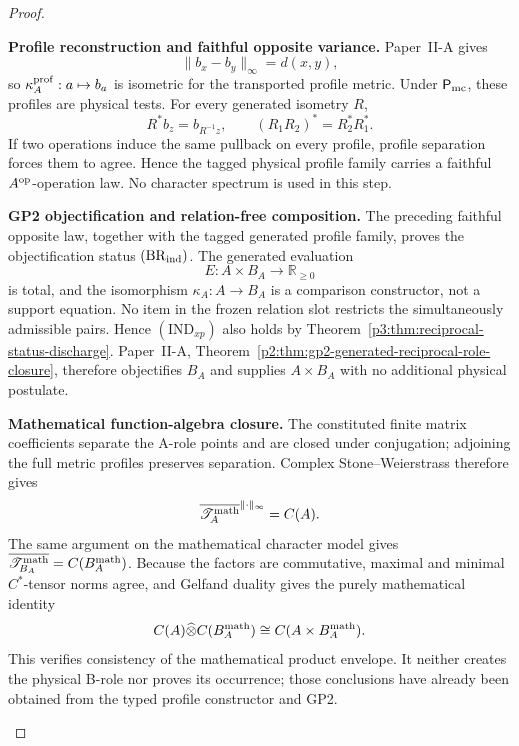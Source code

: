 \documentclass[11pt,a4paper]{article}
\begin{document}
\begin{proof}
\begin{proofsteps}
\item \textbf{Profile reconstruction and faithful opposite variance.}
Paper~II-A gives
\[
 \|b_x-b_y\|_\infty=d(x,y),
\]
so \(\kappa_A^{\rm prof}:a\mapsto b_a\) is isometric for the transported
profile metric.  Under \(\mathsf P_{\rm mc}\), these profiles are physical
tests.  For every generated isometry \(R\),
\[
 R^*b_z=b_{R^{-1}z},
 \qquad (R_1R_2)^*=R_2^*R_1^*.
\]
If two operations induce the same pullback on every profile, profile
separation forces them to agree.  Hence the tagged physical profile family
carries a faithful \(A^{\rm op}\)-operation law.  No character spectrum is
used in this step.

\item \textbf{GP2 objectification and relation-free composition.}
The preceding faithful opposite law, together with the tagged generated
profile family, proves the objectification status
\((\mathrm{BR}_{\rm ind})\).  The generated evaluation
\[
 E:A\times B_A\to\mathbb R_{\ge0}
\]
is total, and the isomorphism \(\kappa_A:A\to B_A\) is a comparison
constructor, not a support equation.  No item in the frozen relation slot
restricts the simultaneously admissible pairs.  Hence
\((\mathrm{IND}_{xp})\) also holds by
Theorem~\ref{p3:thm:reciprocal-status-discharge}.  Paper~II-A,
Theorem~\ref{p2:thm:gp2-generated-reciprocal-role-closure}, therefore
objectifies \(B_A\) and supplies \(A\times B_A\) with no additional physical
postulate.

\item \textbf{Mathematical function-algebra closure.}
The constituted finite matrix coefficients separate the A-role points and
are closed under conjugation; adjoining the full metric profiles preserves
separation.  Complex Stone--Weierstrass therefore gives
\[
 \overline{\mathscr T_A^{\rm math}}^{\|\cdot\|_\infty}=C(A).
\]
The same argument on the mathematical character model gives
\(\overline{\mathscr T_{B_A}^{\rm math}}=C(B_A^{\rm math})\).  Because the
factors are commutative, maximal and minimal \(C^*\)-tensor norms agree, and
Gelfand duality gives the purely mathematical identity
\[
 C(A)\widehat\otimes C(B_A^{\rm math})
 \cong C(A\times B_A^{\rm math}).
\]
This verifies consistency of the mathematical product envelope.  It neither
creates the physical B-role nor proves its occurrence; those conclusions have
already been obtained from the typed profile constructor and GP2.


\end{proofsteps}
\end{proof}
\end{document}
